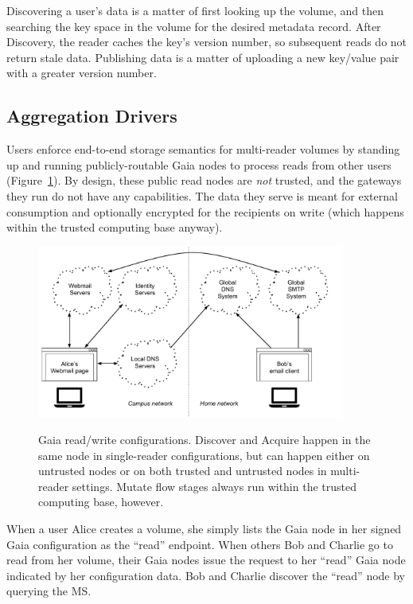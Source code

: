 Discovering a user's data is a matter of first looking up the volume, and then
searching the key space in the volume for the desired metadata record.  After
Discovery, the reader caches the key's version number, so subsequent reads do
not return stale data.  Publishing data is a matter of uploading a new key/value
pair with a greater version number.

\subsection{Aggregation Drivers}

Users enforce end-to-end storage semantics for multi-reader volumes by standing up and running
publicly-routable Gaia nodes to process reads from other users
(Figure~\ref{fig:chap3-gaia-reads-writes}).  By design,
these public read nodes are \emph{not} trusted, and the gateways they run do not
have any capabilities.  The data they serve is
meant for external consumption and optionally encrypted for the recipients on
write (which happens within the trusted computing base anyway).

\begin{figure}[h]
   \caption{Gaia read/write configurations.  Discover and Acquire happen in the
   same node in single-reader configurations, but can happen either on untrusted
   nodes or on both trusted and untrusted nodes in multi-reader settings.
   Mutate flow stages always run within the trusted computing base, however.}
   \centering
   \includegraphics[width=0.9\textwidth,page=19]{figures/dissertation-figures}
   \label{fig:chap3-gaia-reads-writes}
\end{figure}

When a user Alice creates a volume, she simply lists the Gaia node
in her signed Gaia configuration as the ``read'' endpoint.  When others Bob and Charlie go to
read from her volume, their Gaia nodes issue the request to her ``read'' Gaia node
indicated by her configuration data.  Bob and Charlie discover the ``read'' node 
by querying the MS.

